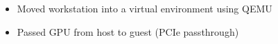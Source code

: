 \begin{itemize}
  \item Moved workstation into a virtual environment using QEMU
  \item Passed GPU from host to guest (PCIe passthrough)
\end{itemize}
\vspace{4pt}
